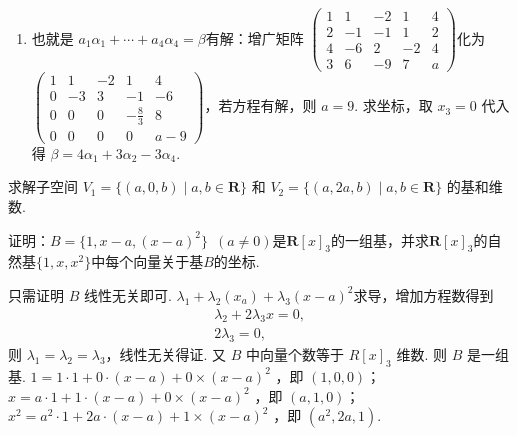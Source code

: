 \begin{exercise}
\begin{exgroup}
\begin{answer}
\begin{enumerate}
                \item 也就是 $a_1\alpha_1+\cdots+a_4\alpha_4=\beta$有解：增广矩阵 $\begin{pmatrix}
                              1 & 1  & -2 & 1  & 4 \\
                              2 & -1 & -1 & 1  & 2 \\
                              4 & -6 & 2  & -2 & 4 \\
                              3 & 6  & -9 & 7  & a\end{pmatrix}$化为 $\begin{pmatrix}
                              1 & 1  & -2 & 1         & 4   \\
                              0 & -3 & 3  & -1        & -6  \\
                              0 & 0  & 0  & -\frac 83 & 8   \\
                              0 & 0  & 0  & 0         & a-9\end{pmatrix}$，若方程有解，则 $a=9$. 求坐标，取 $x_3=0$ 代入得 $\beta=4\alpha_1+3\alpha_2-3\alpha_4$.
            \end{enumerate}
        \end{answer}

        \item 求解子空间 $V_1 = \{(a,0,b) \mid a,b \in \mathbf{R}\}$ 和 $V_2 = \{(a,2a,b) \mid a,b \in \mathbf{R}\}$ 的基和维数.
        \begin{answer}

        \end{answer}

        \item 证明：$B=\{1,x-a,(x-a)^2\}\enspace(a\neq 0)$是$\mathbf{R}[x]_3$的一组基，并求$\mathbf{R}[x]_3$的自然基$\{1,x,x^2\}$中每个向量关于基$B$的坐标.
        \begin{answer}
            只需证明 $B$ 线性无关即可. $\lambda_1+\lambda_2(x_a)+\lambda_3(x-a)^2$求导，增加方程数得到
            \begin{gather*}
                \lambda_2+2\lambda_3x=0, \\
                2\lambda_3=0,
            \end{gather*}
            则 $\lambda_1=\lambda_2=\lambda_3$，线性无关得证. 又 $B$ 中向量个数等于 $R[x]_3$ 维数. 则 $B$ 是一组基. $1=1 \cdot 1+0 \cdot (x-a)+0\times(x-a)^2$ ，即 $(1,0,0)$；$x=a \cdot 1+1 \cdot (x-a)+0\times(x-a)^2$ ，即 $(a,1,0)$；$x^2=a^2 \cdot 1+2a \cdot (x-a)+1\times(x-a)^2$ ，即 $(a^2,2a,1)$.
        \end{answer}


\end{exgroup}
\end{exercise}
